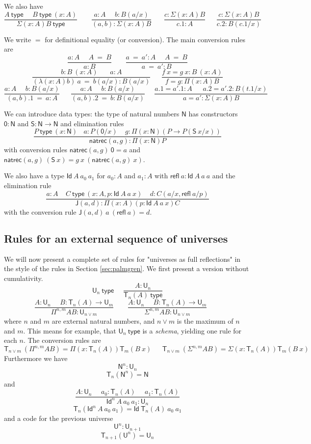 \documentclass[11pt,a4paper]{article}
\newcommand{\refl}{\mathsf{refl}}
\newcommand{\Id}{\mathsf{Id}}
\newcommand{\conv}{=}
\def\NN{\mathsf{N}}
\def\UU{\mathsf{U}}
\def\JJ{\mathsf{J}}
\def\ZERO{\mathsf{0}}
\def\SUCC{\mathsf{S}}
\newcommand{\type}{\mathsf{type}}
\newcommand{\T}{\mathsf{T}}
\newcommand{\natrec}{\mathsf{natrec}}
\begin{document}
We also have
$$
\frac{A~\type~~~~~~B~\type~(x:A)}{\Sigma (x:A) B~\type}~~~~~~~~~
\frac{a:A~~~~~~b:B(a/x)}{(a,b):\Sigma (x:A) B}~~~~~~~~
\frac{c:\Sigma (x:A) B}{c.1:A}~~~~~~~
\frac{c:\Sigma (x:A) B}{c.2:B(c.1/x)}
$$

We write $\conv$ for definitional equality (or conversion). The main conversion rules are
$$
\frac{ a:A~~~~~~ A~ \conv~ B}{ a:B}~~~~~~~~~
\frac{ a ~\conv~a':A~~~~~~ A  ~\conv~ B}{ a ~\conv~a':B}
$$
$$
\frac{b:B~(x:A)~~~~~~~~ a:A}{ (\lambda (x:A)b)~a  ~\conv~ b(a/x):B(a/x)}
~~~~~~~
\frac{f~x = g~x:B~(x:A)}{ f = g : \Pi (x:A)B}
$$
$$
\frac{ a:A~~~~~~ b:B(a/x)}{ (a,b).1  ~\conv~ a:A}
~~~~~~~
\frac{ a:A~~~~~~ b:B(a/x)}{ (a,b).2  ~\conv~ b:B(a/x)}~~~~~~
\frac{ a.1 = a'.1:A~~~~~~~ a.2 = a'.2:B(t.1/x)}{ a = a' : \Sigma (x:A)B}
$$

We can introduce data types: the type of natural numbers $\NN$ has
constructors $\ZERO:\NN$ and $\SUCC:\NN\rightarrow\NN$ and elimination rules
$$
\frac{P~\type~(x:\NN)~~~~a:P(\ZERO/x)~~~~~g:\Pi (x:\NN)(P\rightarrow P(\SUCC~x/x))}{\natrec(a,g):\Pi (x:\NN)P}
$$
with conversion rules $\natrec(a,g)~\ZERO = a$ and $\natrec(a,g)~(\SUCC~x) = g~x~(\natrec(a,g)~x)$.

We also have a type $\Id~A~a_0~a_1$ for $a_0:A$ and $a_1:A$ with $\refl~a:\Id~A~a~a$
and the elimination rule
$$\frac{a:A~~~~~C~\type~(x:A,p:\Id~A~a~x)~~~~~d:C(a/x,\refl~a/p)}{\JJ (a,d):\Pi (x:A)(p:\Id~A~a~x)C}$$
with the conversion rule $\JJ(a,d)~a~(\refl~a) = d$.

\subsection*{Rules for an external sequence of universes}

We will now present a complete set of rules for "universes as full reflections" in the style of the rules in Section \ref{sec:palmgren}. We first present a version without cumulativity.
$$
\UU_n~\type~~~~~~
\frac{A:\UU_{n}}{\T_{n}(A)~\type}
$$
$$
\frac{A:\UU_{n}~~~~~~B:\T_{n}(A)\rightarrow \UU_{m}}
     {\Pi^{n,m} A B:\UU_{n\vee m}}~~~~~~~~~
\frac{A:\UU_{n}~~~~~~B:\T_{n}(A)\rightarrow \UU_{m}}
     {\Sigma^{n,m} A B:\UU_{n\vee m}}~~~~~~~~~
$$
where $n$ and $m$ are external natural numbers, and $n \vee m$ is the maximum of $n$ and $m$. This means for example, that $\UU_n~\type$ is a {\em schema}, yielding one rule for each $n$.
The conversion rules are
$$
\T_{n\vee m}~(\Pi^{n,m} A B) = \Pi (x:\T_{n}(A)) \T_{m}(B~x)~~~~~~~
\T_{n\vee m}~(\Sigma^{n,m} A B) = \Sigma (x:\T_{n}(A)) \T_{m}(B~x)~~~~~~~
$$
Furthermore we have $$\NN^{n}:\UU_{n}$$
$$\T_{n}(\NN^{n}) = \NN$$
and
$$
\frac{A:\UU_n~~~~~~a_0:\T_n(A)~~~~~~a_1:\T_n(A)}
{\Id^n~A~a_0~a_1:\UU_n}
$$
$$\T_n(\Id^n~A~a_0~a_1) = \Id~\T_n(A)~a_0~a_1$$
and a code for the previous universe
$${\UU^{n}}:\UU_{n + 1}$$
$$\T_{n + 1}({\UU^{n}}) = \UU_{n}$$
\end{document}
